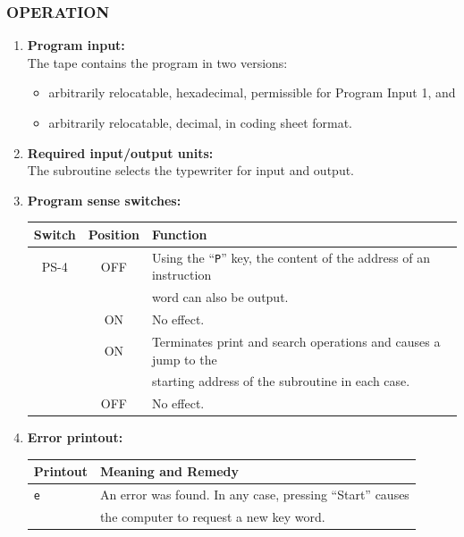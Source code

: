\subsubsection*{OPERATION}
\begin{enumerate}
    \item \textbf{Program input:} \\
    The tape contains the program in two versions:
    \begin{itemize}
        \item[a)] arbitrarily relocatable, hexadecimal, permissible for Program Input 1, and
        \item[b)] arbitrarily relocatable, decimal, in coding sheet format.
    \end{itemize}
    \item \textbf{Required input/output units:} \\
    The subroutine selects the typewriter for input and output.
    \item \textbf{Program sense switches:}
    \begin{table}[h!]
    \centering
    \begin{tabular}{ccl}
    \toprule
    \textbf{Switch} & \textbf{Position} & \textbf{Function} \\
    \midrule
    \textsf{PS-4}  & \textsf{OFF} & Using the ``\texttt{P}'' key, the content of the address of an instruction \\
          &     & word can also be output. \\
          & \textsf{ON}  & No effect. \\
    \midrule
    \textsf{PST   & \textsf{ON}  & Terminates print and search operations and causes a jump to the \\
          &     & starting address of the subroutine in each case. \\
          & \textsf{OFF} & No effect. \\
    \bottomrule
    \end{tabular}
    \end{table}
    \item \textbf{Error printout:}
    \begin{table}[h!]
    \centering
    \begin{tabular}{ll}
    \toprule
    \textbf{Printout} & \textbf{Meaning and Remedy} \\
    \midrule
    \texttt{e}        & An error was found. In any case, pressing ``Start'' causes \\
                      & the computer to request a new key word. \\
    \bottomrule
    \end{tabular}
    \end{table}
\end{enumerate}

